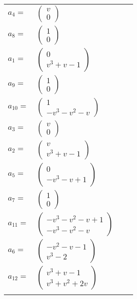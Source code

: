 \documentclass[1p]{elsarticle_modified}
\theoremstyle{definition}
\begin{document}
\begin{tabular}{m{7pt} m{180pt} m{7pt} m{180pt} }
\flushright $a_{4}=$&$\begin{pmatrix}v\\0\end{pmatrix}$ \\
\flushright $a_{8}=$&$\begin{pmatrix}1\\0\end{pmatrix}$ \\
\flushright $a_{1}=$&$\begin{pmatrix}0\\v^3+v-1\end{pmatrix}$ \\
\flushright $a_{9}=$&$\begin{pmatrix}1\\0\end{pmatrix}$ \\
\flushright $a_{10}=$&$\begin{pmatrix}1\\- v^3- v^2- v\end{pmatrix}$ \\
\flushright $a_{3}=$&$\begin{pmatrix}v\\0\end{pmatrix}$ \\
\flushright $a_{2}=$&$\begin{pmatrix}v\\v^3+v-1\end{pmatrix}$ \\
\flushright $a_{5}=$&$\begin{pmatrix}0\\- v^3- v+1\end{pmatrix}$ \\
\flushright $a_{7}=$&$\begin{pmatrix}1\\0\end{pmatrix}$ \\
\flushright $a_{11}=$&$\begin{pmatrix}- v^3- v^2- v+1\\- v^3- v^2- v\end{pmatrix}$ \\
\flushright $a_{6}=$&$\begin{pmatrix}- v^2- v-1\\v^3-2\end{pmatrix}$ \\
\flushright $a_{12}=$&$\begin{pmatrix}v^3+v-1\\v^3+v^2+2 v\end{pmatrix}$\\&\end{tabular}
\end{document}
